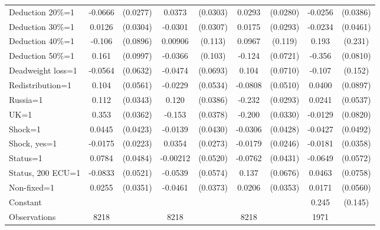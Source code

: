 \begin{tabular}{l|cccccc|cc}
Deduction 20\%=1&  -0.0666\sym{**} & (0.0277)&   0.0373         & (0.0303)&   0.0293         & (0.0280)&  -0.0256         & (0.0386)\\
Deduction 30\%=1&   0.0126         & (0.0304)&  -0.0301         & (0.0307)&   0.0175         & (0.0293)&  -0.0234         & (0.0461)\\
Deduction 40\%=1&   -0.106         & (0.0896)&  0.00906         &  (0.113)&   0.0967         &  (0.119)&    0.193         &  (0.231)\\
Deduction 50\%=1&    0.161         & (0.0997)&  -0.0366         &  (0.103)&   -0.124\sym{*}  & (0.0721)&   -0.356\sym{***}& (0.0810)\\
Deadweight loss=1&  -0.0564         & (0.0632)&  -0.0474         & (0.0693)&    0.104         & (0.0710)&   -0.107         &  (0.152)\\
Redistribution=1&    0.104\sym{*}  & (0.0561)&  -0.0229         & (0.0534)&  -0.0808         & (0.0510)&   0.0400         & (0.0897)\\
Russia=1        &    0.112\sym{***}& (0.0343)&    0.120\sym{***}& (0.0386)&   -0.232\sym{***}& (0.0293)&   0.0241         & (0.0537)\\
UK=1            &    0.353\sym{***}& (0.0362)&   -0.153\sym{***}& (0.0378)&   -0.200\sym{***}& (0.0330)&  -0.0129         & (0.0820)\\
Shock=1         &   0.0445         & (0.0423)&  -0.0139         & (0.0430)&  -0.0306         & (0.0428)&  -0.0427         & (0.0492)\\
Shock, yes=1    &  -0.0175         & (0.0223)&   0.0354         & (0.0273)&  -0.0179         & (0.0246)&  -0.0181         & (0.0358)\\
Status=1        &   0.0784         & (0.0484)& -0.00212         & (0.0520)&  -0.0762\sym{*}  & (0.0431)&  -0.0649         & (0.0572)\\
Status, 200 ECU=1&  -0.0833         & (0.0521)&  -0.0539         & (0.0574)&    0.137\sym{**} & (0.0676)&   0.0463         & (0.0758)\\
Non-fixed=1     &   0.0255         & (0.0351)&  -0.0461         & (0.0373)&   0.0206         & (0.0353)&   0.0171         & (0.0560)\\
Constant        &                  &         &                  &         &                  &         &    0.245\sym{*}  &  (0.145)\\
\hline
Observations    &     8218         &         &     8218         &         &     8218         &         &     1971         &         \\

\end{tabular}
